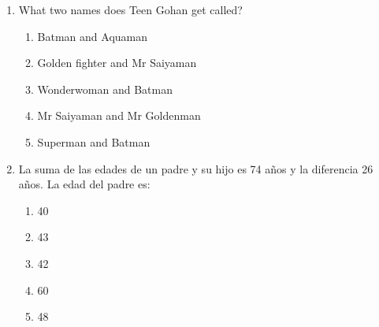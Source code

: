 \documentclass[letterpaper,addpoints,answers,twocolumn,10pt]{exam}
\begin{document}
\begin{enumerate}[leftmargin=.2in]
\begin{enumerate}[noitemsep,leftmargin=0in]
\end{enumerate}



\item  What two names does Teen Gohan get called?


\begin{enumerate}[noitemsep,leftmargin=0in]


\item  Batman and Aquaman
\item  Golden fighter and Mr Saiyaman
\item  Wonderwoman and Batman
\item  Mr Saiyaman and Mr Goldenman
\item  Superman and Batman


\end{enumerate}



\item  La suma de las edades de un padre y su hijo es 74 años y la diferencia 26 años. La edad del padre es:


\begin{enumerate}[noitemsep,leftmargin=0in]


\item  40
\item  43
\item  42
\item  60
\item  48


\end{enumerate}



\end{enumerate}
\end{document}
